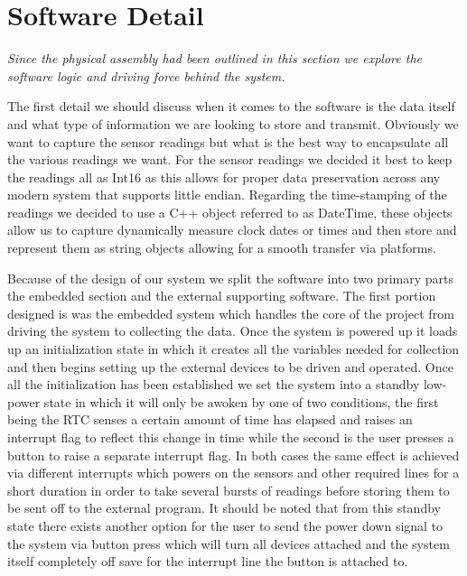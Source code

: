 \documentclass[comsoc, 12pt]{IEEEtran}
\begin{document}
\section{Software Detail}
\begin{center}
    \textit{Since the physical assembly had been outlined in this section we explore the software logic and driving force behind the system.}
\end{center}
The first detail we should discuss when it comes to the software is the data itself and what type of information we are looking to store and transmit. Obviously we want to capture the sensor readings but what is the best way to encapsulate all the various readings we want. For the sensor readings we decided it best to keep the readings all as Int16 as this allows for proper data preservation across any modern system that supports little endian. Regarding the time-stamping of the readings we decided to use a C++ object referred to as DateTime, these objects allow us to capture dynamically measure clock dates or times and then store and represent them as string objects allowing for a smooth transfer via platforms. 
\par Because of the design of our system we split the software into two primary parts the embedded section and the external supporting software. The first portion designed is was the embedded system which handles the core of the project from driving the system to collecting the data. Once the system is powered up it loads up an initialization state in which it creates all the variables needed for collection and then begins setting up the external devices to be driven and operated. Once all the initialization has been established we set the system into a standby low-power state in which it will only be awoken by one of two conditions, the first being the RTC senses a certain amount of time has elapsed and raises an interrupt flag to reflect this change in time while the second is the user presses a button to raise a separate interrupt flag. In both cases the same effect is achieved via different interrupts which powers on the sensors and other required lines for a short duration in order to take several bursts of readings before storing them to be sent off to the external program. It should be noted that from this standby state there exists another option for the user to send the power down signal to the system via button press which will turn all devices attached and the system itself completely off save for the interrupt line the button is attached to.  \par
\end{document}
